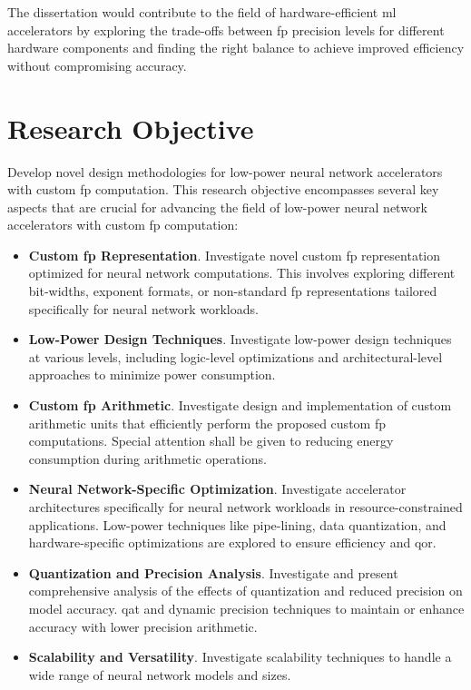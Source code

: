The dissertation would contribute to the field of hardware-efficient \gls{ml} accelerators by exploring the trade-offs between \gls{fp} precision levels for different hardware components and finding the right balance to achieve improved efficiency without compromising accuracy.

\section{Research Objective}
Develop novel design methodologies for low-power neural network accelerators with custom \gls{fp} computation. This research objective encompasses several key aspects that are crucial for advancing the field of low-power neural network accelerators with custom \gls{fp} computation:

\begin{itemize}
	\item \textbf{Custom \gls{fp} Representation}. Investigate novel custom \gls{fp} representation optimized for neural network computations. This involves exploring different bit-widths, exponent formats, or non-standard \gls{fp} representations tailored specifically for neural network workloads.
	\item \textbf{Low-Power Design Techniques}. Investigate low-power design techniques at various levels, including logic-level optimizations and architectural-level approaches to minimize power consumption.
	\item \textbf{Custom \gls{fp} Arithmetic}. Investigate design and implementation of custom arithmetic units that efficiently perform the proposed custom \gls{fp} computations. Special attention shall be given to reducing energy consumption during arithmetic operations.
	\item \textbf{Neural Network-Specific Optimization}. Investigate accelerator architectures specifically for neural network workloads in resource-constrained applications. Low-power techniques like pipe-lining, data quantization, and hardware-specific optimizations are explored to ensure efficiency and \gls{qor}.
	\item \textbf{Quantization and Precision Analysis}. Investigate and present comprehensive analysis of the effects of quantization and reduced precision on model accuracy. \gls{qat} and dynamic precision techniques to maintain or enhance accuracy with lower precision arithmetic.
	\item \textbf{Scalability and Versatility}. Investigate scalability techniques to handle a wide range of neural network models and sizes.

\end{itemize}
